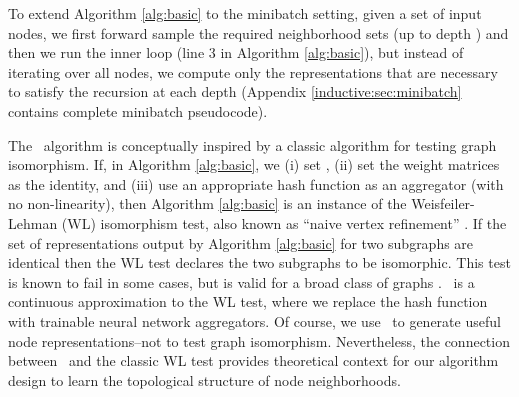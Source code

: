 To extend Algorithm \ref{alg:basic} to the minibatch setting, given a set of input nodes, we first forward sample the required neighborhood sets (up to depth ) and then we run the inner loop (line 3 in Algorithm \ref{alg:basic}), but instead of iterating over all nodes, we compute only the representations that are necessary to satisfy the recursion at each depth (Appendix \ref{inductive:sec:minibatch} contains complete minibatch pseudocode).

\label{inductive:sec:wl}
The \name\ algorithm is conceptually inspired by a classic algorithm for testing graph isomorphism. 
If, in Algorithm \ref{alg:basic}, we (i) set , (ii) set the weight matrices as the identity, and (iii) use an appropriate hash function as an aggregator (with no non-linearity), then Algorithm \ref{alg:basic} is an instance of the Weisfeiler-Lehman (WL) isomorphism test, also known as ``naive vertex refinement'' \cite{shervashidze2011weisfeiler}.
If the set of representations  output by Algorithm \ref{alg:basic} for two subgraphs are identical then the WL test declares the two subgraphs to be isomorphic.
This test is known to fail in some cases, but is valid for a broad class of graphs \cite{shervashidze2011weisfeiler}.
\name\ is a continuous approximation to the WL test, where we replace the hash function with trainable neural network aggregators. 
Of course, we use \name\ to generate useful node representations--not to test graph isomorphism. 
Nevertheless, the connection between \name\ and the classic WL test provides theoretical context for our algorithm design to learn the topological structure of node neighborhoods. 

